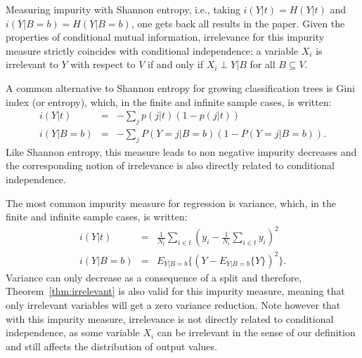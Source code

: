 \documentclass{article}
\begin{document}
Measuring impurity with Shannon entropy, i.e., taking $i(Y|t)=H(Y|t)$
and $i(Y|B=b)=H(Y|B=b)$, one gets back all results in the paper. Given the
properties of conditional mutual information, irrelevance for this
impurity measure strictly coincides with conditional independence: a
variable $X_i$ is irrelevant to $Y$ with respect to $V$ if and only if
$X_i\perp Y|B$ for all $B\subseteq V$.

A common alternative to Shannon entropy for growing classification
trees is Gini index (or entropy), which, in the finite and infinite
sample cases, is written:
\begin{eqnarray*}
i(Y|t)&=& -\sum_j p(j|t) (1-p(j|t))\\
i(Y|B=b)&=& -\sum_j P(Y=j|B=b) (1-P(Y=j|B=b)).
\end{eqnarray*}
Like Shannon entropy, this measure leads to non negative impurity
decreases and the corresponding notion of irrelevance is also directly
related to conditional independence.

The most common impurity measure for regression is variance, which, in
the finite and infinite sample cases, is written:
\begin{eqnarray*}
i(Y|t)&=&\frac{1}{N_t} \sum_{i\in t} (y_i-\frac{1}{N_t}
\sum_{i\in t} y_i)^2\\
i(Y|B=b)&=&E_{Y|B=b}\{(Y-E_{Y|B=b}\{Y\})^2\}.
\end{eqnarray*}
Variance can only decrease as a consequence of a split and therefore,
Theorem~\ref{thm:irrelevant} is also valid for this impurity measure,
meaning that only irrelevant variables will get a zero variance
reduction. Note however that with this impurity measure, irrelevance
is not directly related to conditional independence, as some variable
$X_i$ can be irrelevant in the sense of our definition and still
affects the distribution of output values.



\vfill
\end{document}
